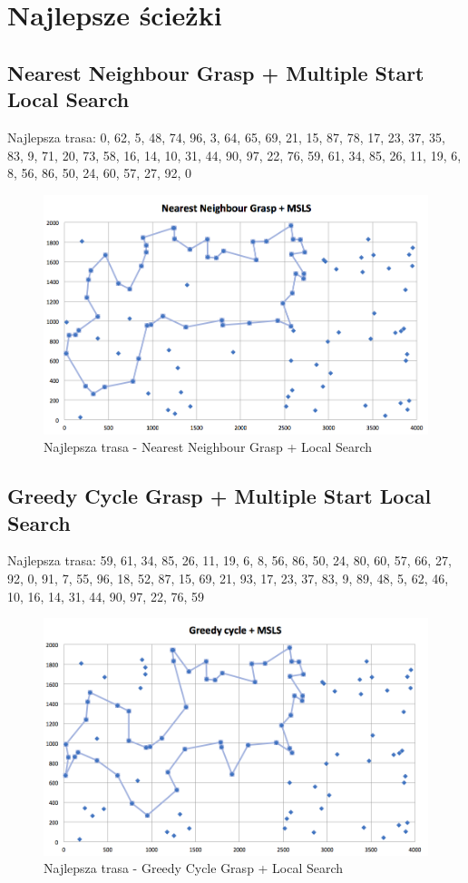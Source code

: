 \documentclass[a4paper 10pt]{article}
\begin{document}
\section{Najlepsze ścieżki}
\subsection{Nearest Neighbour Grasp + Multiple Start Local Search}
Najlepsza trasa: 0, 62, 5, 48, 74, 96, 3, 64, 65, 69, 21, 15, 87, 78, 17, 23, 37, 35, 83, 9, 71, 20, 73, 58, 16, 14, 10, 31, 44, 90, 97, 22, 76, 59, 61, 34, 85, 26, 11, 19, 6, 8, 56, 86, 50, 24, 60, 57, 27, 92, 0 
\begin{figure} [H]
\centering
\includegraphics[angle=0,width = 1\textwidth, height=!]{images/NNG_MSLS.png}
\caption{Najlepsza trasa - Nearest Neighbour Grasp + Local Search}
\label{Rys. NN}
\end{figure}

\newpage
\subsection{Greedy Cycle Grasp + Multiple Start Local Search}
Najlepsza trasa: 59, 61, 34, 85, 26, 11, 19, 6, 8, 56, 86, 50, 24, 80, 60, 57, 66, 27, 92, 0, 91, 7, 55, 96, 18, 52, 87, 15, 69, 21, 93, 17, 23, 37, 83, 9, 89, 48, 5, 62, 46, 10, 16, 14, 31, 44, 90, 97, 22, 76, 59 
\begin{figure} [H]
\centering
\includegraphics[angle=0,width = 1\textwidth, height=!]{images/GCG_MSLS.png}
\caption{Najlepsza trasa - Greedy Cycle Grasp + Local Search}
\label{Rys. NN}
\end{figure}
\newpage
\end{document}
